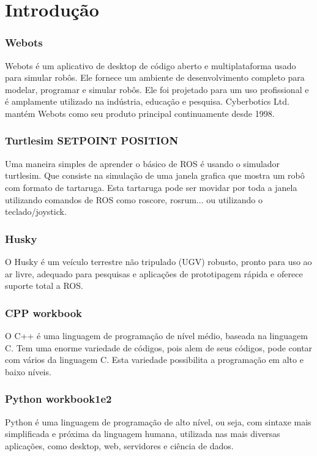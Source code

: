 \chapter{Introdução}
\label{chap:intro}
\subsection{Webots}
Webots é um aplicativo de desktop de código aberto e multiplataforma usado para simular robôs. 
Ele fornece um ambiente de desenvolvimento completo para modelar, programar e simular robôs.
Ele foi projetado para um uso profissional e é amplamente utilizado na indústria, educação e pesquisa.
Cyberbotics Ltd. mantém Webots como seu produto principal continuamente desde 1998.
\subsection{Turtlesim SETPOINT POSITION }
Uma maneira simples de aprender o básico de ROS é usando o simulador turtlesim. Que consiste na simulação 
de uma janela grafica que mostra um robô com formato de tartaruga. Esta tartaruga pode ser movidar por 
toda a janela utilizando comandos de ROS como roscore, rosrum... ou utilizando o teclado/joystick.
\subsection{Husky}
O Husky é um veículo terrestre não tripulado (UGV) robusto, pronto para uso ao ar livre, adequado para 
pesquisas e aplicações de prototipagem rápida e oferece suporte total a ROS.
\subsection{CPP workbook}
O C++ é uma linguagem de programação de nível médio, baseada na linguagem C.
Tem uma enorme variedade de códigos, pois alem de seus códigos, pode contar com vários da linguagem C.
Esta variedade possibilita a programação em alto e baixo níveis.
\subsection{Python workbook1e2}
Python é uma linguagem de programação de alto nível, ou seja, com sintaxe mais simplificada e próxima da 
linguagem humana, utilizada nas mais diversas aplicações, como desktop, web, servidores e ciência de dados.
